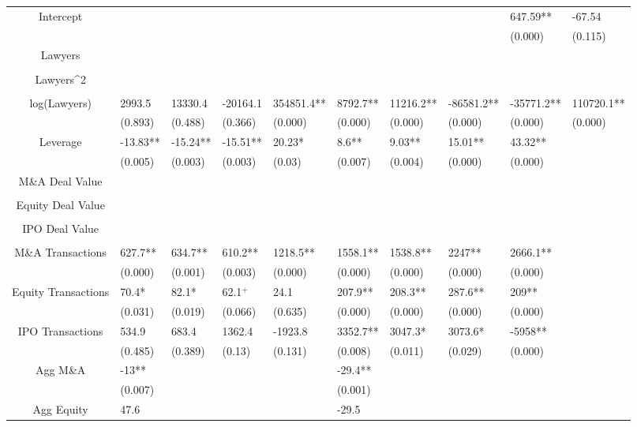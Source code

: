 \documentclass{article}
\begin{document}
\begin{table}[H]
\begin{tabular}{|clllllllll|}
Intercept &  &  &  &  &  &  &  & 647.59** & -67.54 \\ 
   &  &  &  &  &  &  &  & (0.000) & (0.115) \\ 
  Lawyers &  &  &  &  &  &  &  &  &  \\ 
   &  &  &  &  &  &  &  &  &  \\ 
  Lawyers^2 &  &  &  &  &  &  &  &  &  \\ 
   &  &  &  &  &  &  &  &  &  \\ 
  log(Lawyers) & 2993.5 & 13330.4 & -20164.1 & 354851.4** & 8792.7** & 11216.2** & -86581.2** & -35771.2** & 110720.1** \\ 
   & (0.893) & (0.488) & (0.366) & (0.000) & (0.000) & (0.000) & (0.000) & (0.000) & (0.000) \\ 
  Leverage & -13.83** & -15.24** & -15.51** & 20.23* & 8.6** & 9.03** & 15.01** & 43.32** &  \\ 
   & (0.005) & (0.003) & (0.003) & (0.03) & (0.007) & (0.004) & (0.000) & (0.000) &  \\ 
  M\&A Deal Value &  &  &  &  &  &  &  &  &  \\ 
   &  &  &  &  &  &  &  &  &  \\ 
  Equity Deal Value &  &  &  &  &  &  &  &  &  \\ 
   &  &  &  &  &  &  &  &  &  \\ 
  IPO Deal Value &  &  &  &  &  &  &  &  &  \\ 
   &  &  &  &  &  &  &  &  &  \\ 
  M\&A Transactions & 627.7** & 634.7** & 610.2** & 1218.5** & 1558.1** & 1538.8** & 2247** & 2666.1** &  \\ 
   & (0.000) & (0.001) & (0.003) & (0.000) & (0.000) & (0.000) & (0.000) & (0.000) &  \\ 
  Equity Transactions & 70.4* & 82.1* & 62.1$^{+}$ & 24.1 & 207.9** & 208.3** & 287.6** & 209** &  \\ 
   & (0.031) & (0.019) & (0.066) & (0.635) & (0.000) & (0.000) & (0.000) & (0.000) &  \\ 
  IPO Transactions & 534.9 & 683.4 & 1362.4 & -1923.8 & 3352.7** & 3047.3* & 3073.6* & -5958** &  \\ 
   & (0.485) & (0.389) & (0.13) & (0.131) & (0.008) & (0.011) & (0.029) & (0.000) &  \\ 
  Agg M\&A & -13** &  &  &  & -29.4** &  &  &  &  \\ 
   & (0.007) &  &  &  & (0.001) &  &  &  &  \\ 
  Agg Equity & 47.6 &  &  &  & -29.5 &  &  &  &  \\ 

\end{tabular}
\end{table}
\end{document}
